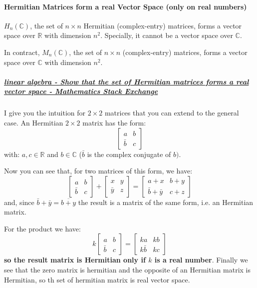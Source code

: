 \paragraph{Hermitian Matrices form a real Vector Space (only on real numbers)}

\begin{theorem}
    $H_n(\mathbb{C})$, the set of $n \times n$ Hermitian (complex-entry) matrices, forms a vector space over $\mathbb{R}$ with dimension $n^2$. Specially, it cannot be a vector space over $\mathbb{C}.$
\end{theorem}

\begin{remark}
   In contract, $M_n(\mathbb{C})$, the set of $n \times n$ (complex-entry) matrices, forms a vector space over $\mathbb{C}$ with dimension $n^2$.
\end{remark}

\subparagraph{\href{https://math.stackexchange.com/questions/1630604/show-that-the-set-of-hermitian-matrices-forms-a-real-vector-space}{linear algebra - Show that the set of Hermitian matrices forms a real vector space - Mathematics Stack Exchange} 
}
I give you the intuition for $2 \times 2$ matrices that you can extend to the general case.
An Hermitian $2 \times 2$ matrix has the form:
$$
\left[\begin{array}{ll}
a & b \\
\bar{b} & c
\end{array}\right]
$$
with: $a, c \in \mathbb{R}$ and $b \in \mathbb{C}$ ($\bar{b}$ is the complex conjugate of $b)$.

Now you can see that, for two matrices of this form, we have:
$$
\left[\begin{array}{ll}
a & b \\
\bar{b} & c
\end{array}\right]+\left[\begin{array}{ll}
x & y \\
\bar{y} & z
\end{array}\right]=\left[\begin{array}{ll}
a+x & b+y \\
\bar{b}+\bar{y} & c+z
\end{array}\right]
$$
and, since $\bar{b}+\bar{y}=\overline{b+y}$ the result is a matrix of the same form, i.e. an Hermitian matrix.

For the product we have:
$$
k\left[\begin{array}{ll}
a & b \\
\bar{b} & c
\end{array}\right]=\left[\begin{array}{ll}
k a & k b \\
k \bar{b} & k c
\end{array}\right]
$$
\textbf{so the result matrix is Hermitian only if $k$ is a real number}. Finally we see that the zero matrix is hermitian and the opposite of an Hermitian matrix is Hermitian, so th set of hermitian matrix is real vector space.

